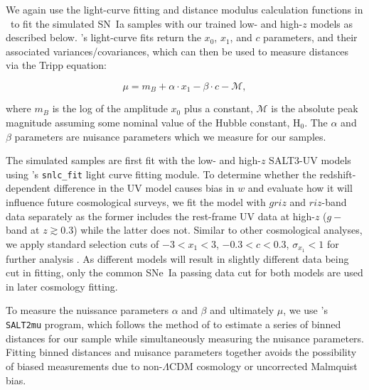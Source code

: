 \documentclass[twocolumn,tighten,times,floatfix]{aastex631}
\newcommand{\snana}{{\fontfamily{qcr}\selectfont{SNANA}}}
\begin{document}
We again use the light-curve fitting and distance modulus calculation functions in \snana\ to fit the simulated SN~Ia samples with our trained low- and high-$z$ models as described below. \snana's light-curve fits return the $x_0$, $x_1$, and $c$ parameters, and their associated variances/covariances, which can then be used to measure distances via the Tripp equation:

\begin{equation}
    \mu = m_B + \alpha \cdot x_1 - \beta \cdot c -\mathcal{M},
    \label{eqn2}
\end{equation}

\noindent where $m_B$ is %
the log of the amplitude $x_0$ plus a constant, $\mathcal{M}$ is the absolute peak magnitude assuming some nominal value of the Hubble constant, H$_0$. The $\alpha$ and $\beta$ parameters are nuisance parameters which we measure for our samples.

The simulated samples are first fit with the low- and high-$z$ SALT3-UV models using \snana's {\tt snlc\_fit} light curve fitting module. %
To determine whether the redshift-dependent difference in the UV model causes bias in $w$ and evaluate how it will influence future cosmological surveys, we fit the model with $griz$ and $riz$-band data separately as the former includes the rest-frame UV data at high-$z$ ($g-$band at $z\gtrsim0.3$) while the latter does not.
Similar to other cosmological analyses, we apply standard selection cuts of $-3 < x_1 < 3$, $-0.3 < c < 0.3$, $\sigma_{x_1} < 1$ for further analysis \citep[e.g.,][]{Brout22}. As different models will result in slightly different data being cut in fitting, only the common SNe~Ia passing data cut for both models are used in later cosmology fitting.


To measure the nuissance parameters $\alpha$ and $\beta$ and ultimately $\mu$, we use \snana 's {\tt SALT2mu} program, which follows the method of \citet{Marriner11} to estimate a series of binned distances for our sample while simultaneously measuring the nuisance parameters. Fitting binned distances and nuisance parameters together avoids the possibility of biased measurements due to non-$\Lambda$CDM cosmology or uncorrected Malmquist bias. 
\end{document}
